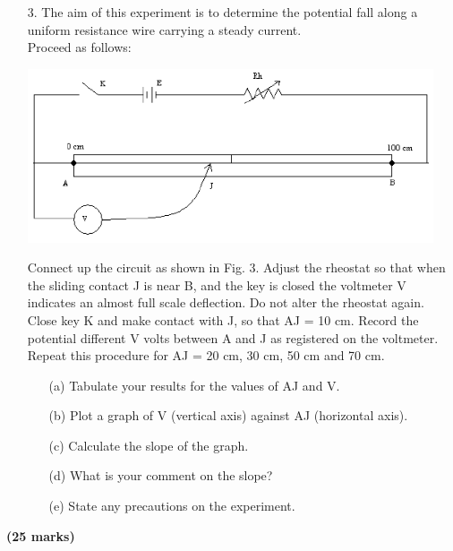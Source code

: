 \begin{enumerate}
\item[3.] The aim of this experiment is to determine the potential fall along a uniform resistance wire carrying a steady current.\\[10pt]

Proceed as follows:

\begin{center}
\includegraphics[width=12cm]{./img/2007-3-alt.png}
\end{center}

Connect up the circuit as shown in Fig. 3. Adjust the rheostat so that when the sliding contact J is near B, and the key is closed the voltmeter V indicates an almost full scale deflection. Do not alter the rheostat again.\\

Close key K and make contact with J, so that AJ = 10 cm. Record the potential different V volts between A and J as registered on the voltmeter.\\

Repeat this procedure for AJ = 20 cm, 30 cm, 50 cm and 70 cm.

\begin{itemize}
\item[(a)] Tabulate your results for the values of AJ and V.
\item[(b)] Plot a graph of V (vertical axis) against AJ (horizontal axis).
\item[(c)] Calculate the slope of the graph.
\item[(d)] What is your comment on the slope?
\item[(e)] State any precautions on the experiment.
\end{itemize}

\end{enumerate}
\flushright \textbf{(25 marks)}
\flushleft